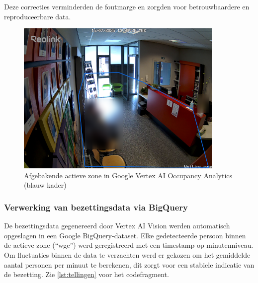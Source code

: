 Deze correcties verminderden de foutmarge en zorgden voor betrouwbaardere en reproduceerbare data.

\begin{figure}[H] 
    \centering
    \includegraphics[width=10cm]{img/bp/vertex/active-zone (1).png}
    \caption{Afgebakende actieve zone in Google Vertex AI Occupancy Analytics (blauw kader)}
    \label{fig:active-zone}
\end{figure}
       

    
    

\subsubsection{Verwerking van bezettingsdata via BigQuery}
De bezettingsdata gegenereerd door Vertex AI Vision werden automatisch opgeslagen in een Google BigQuery-dataset. Elke gedetecteerde persoon binnen de actieve zone (“wgc”) werd geregistreerd met een timestamp op minutenniveau.
Om fluctuaties binnen de data te verzachten werd er gekozen om het gemiddelde aantal personen per minuut te berekenen, dit zorgt voor een stabiele indicatie van de bezetting. Zie \ref{lst:tellingen} voor het codefragment.

